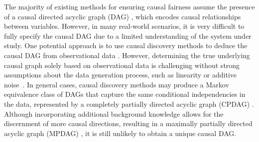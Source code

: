 \documentclass{article} %
\begin{document}
The majority of existing methods for ensuring causal fairness assume the presence of a causal directed acyclic graph (DAG) \citep{pearl2009causality}, which encodes causal relationships between variables. However, in many real-world scenarios, it is very difficult to fully specify the causal DAG due to a limited understanding of the system under study.
One potential approach is to use causal discovery methods to deduce the causal DAG from observational data \citep{spirtes1991algorithm, colombo2014order, spirtes2000constructing, chickering2002optimal, shimizu2006linear,hoyer2008nonlinear, zhang2009identifiability, peters2014causal, peters2014identifiability}. However, determining the true underlying causal graph solely based on observational data is challenging without strong assumptions about the data generation process, such as linearity \citep{shimizu2006linear} or additive noise~\citep{hoyer2008nonlinear, peters2014causal}. In general cases, causal discovery methods may produce a Markov equivalence class of DAGs that capture the same conditional independencies in the data, represented by a completely partially directed acyclic graph (CPDAG) \citep{spirtes2000causation, chickering2002optimal, meek1995causal, andersson1997characterization, chickering2002learning}. Although incorporating additional background knowledge allows for the discernment of more causal directions, resulting in a maximally partially directed acyclic graph (MPDAG) \citep{meek1995causal}, it is still unlikely to obtain a unique causal DAG.
\end{document}
